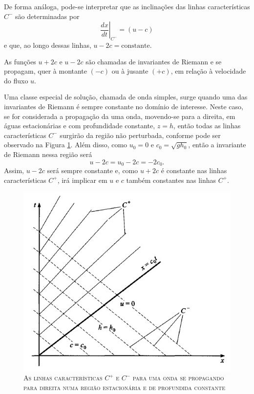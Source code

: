 De forma análoga, pode-se interpretar que as inclinações das linhas características $C^-$ são determinadas por
\begin{equation*}
\left. \frac{dx}{dt} \right|_{C^-} = (u - c)
\end{equation*}
e que, ao longo dessas linhas, $u - 2c = \text{constante}$.

As funções $u+2c$ e $u-2c$ são chamadas de invariantes de Riemann e se propagam, quer à montante $(-c)$ ou à jusante $(+c)$, em relação à velocidade do fluxo $u$.   

Uma classe especial de solução, chamada de onda simples, surge quando uma das invariantes de Riemann é sempre constante no domínio de interesse. Neste caso, se for considerada a propagação da uma onda, movendo-se para a direita, em águas estacionárias e com profundidade constante, $z=h$, então todas as linhas características $C^-$ surgirão da região não perturbada, conforme pode ser observado na Figura \ref{219B}. Além disso, como $u_0=0$ e $c_0 = \sqrt{gh_0}$, então a invariante de Riemann nessa região será
\begin{equation} \label{Equau}
u-2c=u_0 - 2c=-2c_0.
\end{equation}
Assim, $u-2c$ será sempre constante e, como $u+2c$ é constante nas linhas características $C^+$, irá implicar em $u$ e $c$ também constantes nas linhas $C^+$. 

\begin{figure}[H]
	\centering
	\includegraphics[scale=1]{figuras/219B.jpg}
	\caption{\textsc{As linhas características $C^+$ e $C^-$ para uma onda se propagando para direita numa região estacionária e de profundida constante}}
	\vspace{-0.1cm}
	\label{219B}
\end{figure}

